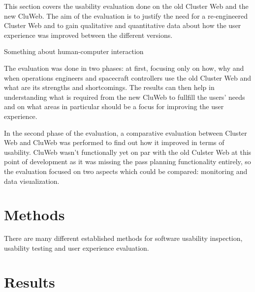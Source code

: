 
This section covers the usability evaluation done on the old Cluster Web and the new CluWeb. The aim of the evaluation is to justify the need for a re-engineered Cluster Web and to gain qualitative and quantitative data about how the user experience was improved between the different versions.

Something about human-computer interaction \cite{4839639}

The evaluation was done in two phases: at first, focusing only on how, why and when operations engineers and spacecraft controllers use the old Cluster Web and what are its strengths and shortcomings. The results can then help in understanding what is required from the new CluWeb to fullfill the users' needs and on what areas in particular should be a focus for improving the user experience.

In the second phase of the evaluation, a comparative evaluation between Cluster Web and CluWeb was performed to find out how it improved in terms of usability. CluWeb wasn't functionally yet on par with the old Culster Web at this point of development as it was missing the pass planning functionality entirely, so the evaluation focused on two aspects which could be compared: monitoring and data visualization.

\section{Methods}

There are many different established methods for software usability inspection, usability testing and user experience evaluation. 

\cite{nielsen1995usability, hollingsed2007usability, holzinger2005usability, rubin2008handbook, dumas1999practical, vermeeren2010user, bevan2009difference, vaananen2008towards, laugwitz2008construction, obrist2009user, battleson2001usability, van2003retrospective, hassenzahl2010needs, albert2013measuring}

\section{Results}